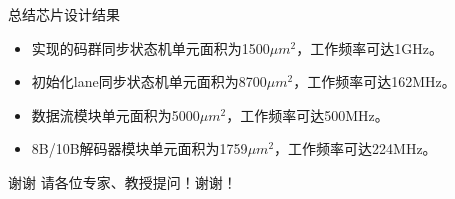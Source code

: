 \documentclass{beamer}
\begin{document}
\begin{frame}{总结}{芯片设计结果}
	\begin{itemize}
	\item 实现的码群同步状态机单元面积为1500$\mu m^2$，工作频率可达1GHz。
	\item 初始化lane同步状态机单元面积为8700$\mu m^2$，工作频率可达162MHz。
	\item 数据流模块单元面积为5000$\mu m^2$，工作频率可达500MHz。
	\item 8B/10B解码器模块单元面积为1759$\mu m^2$，工作频率可达224MHz。
	\end{itemize}
\end{frame}

\begin{frame}{谢谢}{}
	\centering
	请各位专家、教授提问！谢谢！
\end{frame}
\end{document}
